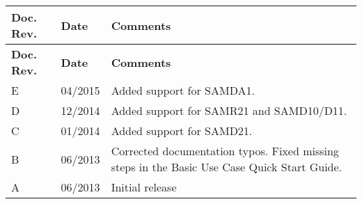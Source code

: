 \tabulinesep=1mm
\begin{longtabu}spread 0pt [c]{*{3}{|X[-1]}|}
\hline
\cellcolor{\tableheadbgcolor}\textbf{ Doc. Rev. }&\cellcolor{\tableheadbgcolor}\textbf{ Date }&\cellcolor{\tableheadbgcolor}\textbf{ Comments  }\\
\endfirsthead
\hline
\endfoot
\hline
\cellcolor{\tableheadbgcolor}\textbf{ Doc. Rev. }&\cellcolor{\tableheadbgcolor}\textbf{ Date }&\cellcolor{\tableheadbgcolor}\textbf{ Comments  }\\
\endhead
E &04/2015 &Added support for SAMDA1.  \\
D &12/2014 &Added support for SAMR21 and SAMD10/\+D11.  \\
C &01/2014 &Added support for SAMD21.  \\
B &06/2013 &Corrected documentation typos. Fixed missing steps in the Basic Use Case Quick Start Guide.  \\
A &06/2013 &Initial release  \\
\end{longtabu}
